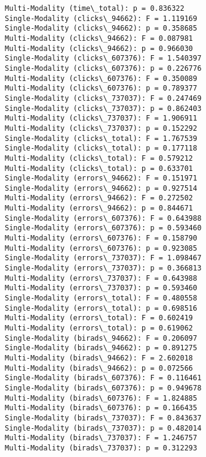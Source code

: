 \documentclass[11pt]{article}
\begin{document}
\begin{Verbatim}[commandchars=\\\{\}]
Multi-Modality (time\_total): p = 0.836322
Single-Modality (clicks\_94662): F = 1.119169
Single-Modality (clicks\_94662): p = 0.358685
Multi-Modality (clicks\_94662): F = 0.087981
Multi-Modality (clicks\_94662): p = 0.966030
Single-Modality (clicks\_607376): F = 1.540397
Single-Modality (clicks\_607376): p = 0.226776
Multi-Modality (clicks\_607376): F = 0.350089
Multi-Modality (clicks\_607376): p = 0.789377
Single-Modality (clicks\_737037): F = 0.247469
Single-Modality (clicks\_737037): p = 0.862403
Multi-Modality (clicks\_737037): F = 1.906911
Multi-Modality (clicks\_737037): p = 0.152292
Single-Modality (clicks\_total): F = 1.767539
Single-Modality (clicks\_total): p = 0.177118
Multi-Modality (clicks\_total): F = 0.579212
Multi-Modality (clicks\_total): p = 0.633701
Single-Modality (errors\_94662): F = 0.151971
Single-Modality (errors\_94662): p = 0.927514
Multi-Modality (errors\_94662): F = 0.272502
Multi-Modality (errors\_94662): p = 0.844671
Single-Modality (errors\_607376): F = 0.643988
Single-Modality (errors\_607376): p = 0.593460
Multi-Modality (errors\_607376): F = 0.158790
Multi-Modality (errors\_607376): p = 0.923085
Single-Modality (errors\_737037): F = 1.098467
Single-Modality (errors\_737037): p = 0.366813
Multi-Modality (errors\_737037): F = 0.643988
Multi-Modality (errors\_737037): p = 0.593460
Single-Modality (errors\_total): F = 0.480558
Single-Modality (errors\_total): p = 0.698516
Multi-Modality (errors\_total): F = 0.602419
Multi-Modality (errors\_total): p = 0.619062
Single-Modality (birads\_94662): F = 0.206097
Single-Modality (birads\_94662): p = 0.891275
Multi-Modality (birads\_94662): F = 2.602018
Multi-Modality (birads\_94662): p = 0.072566
Single-Modality (birads\_607376): F = 0.116461
Single-Modality (birads\_607376): p = 0.949678
Multi-Modality (birads\_607376): F = 1.824885
Multi-Modality (birads\_607376): p = 0.166435
Single-Modality (birads\_737037): F = 0.843637
Single-Modality (birads\_737037): p = 0.482014
Multi-Modality (birads\_737037): F = 1.246757
Multi-Modality (birads\_737037): p = 0.312293

    \end{Verbatim}

    \begin{center}
    \end{center}
    { \hspace*{\fill} \\}
    
    \begin{center}
    \end{center}
    { \hspace*{\fill} \\}
    
\end{document}
